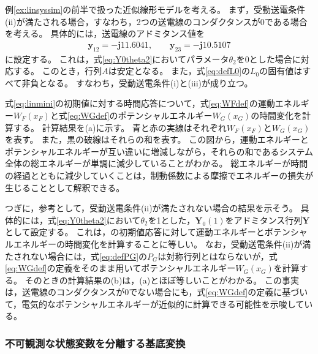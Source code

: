 \documentclass[tombow,dvipdfmx]{corona-a5-1.1}
\begin{document}
\begin{例}[蓄積されるエネルギーの時間変化]\label{ex:energylin}
例\ref{ex:linsyssim}の前半で扱った近似線形モデルを考える。
まず，受動送電条件(ii)が満たされる場合，すなわち，2つの送電線のコンダクタンスが0である場合を考える。
具体的には，送電線のアドミタンス値を
\begin{align}\label{eq:bothlossless}
\bm{y}_{12} = - \bm{j} 11.6041, \qquad
\bm{y}_{23} =  - \bm{j} 10.5107
\end{align}
に設定する。
これは，式\ref{eq:Y0theta2}においてパラメータ$\theta_2$を0とした場合に対応する。
このとき，行列$A$は安定となる。
また，式\ref{eq:defL0}の$L_0$の固有値はすべて非負となる。
すなわち，受動送電条件(i)と(iii)が成り立つ。

式\ref{eq:linmini}の初期値に対する時間応答について，式\ref{eq:WFdef}の運動エネルギー$W_F(x_F)$と式\ref{eq:WGdef}のポテンシャルエネルギー$W_G(x_G)$の時間変化を計算する。
計算結果を(a)に示す。
青と赤の実線はそれぞれ$W_F(x_F)$と$W_G(x_G)$を表す。
また，黒の破線はそれらの和を表す。
この図から，運動エネルギーとポテンシャルエネルギーが互い違いに増減しながら，それらの和であるシステム全体の総エネルギーが単調に減少していることがわかる。
総エネルギーが時間の経過とともに減少していくことは，制動係数による摩擦でエネルギーの損失が生じることとして解釈できる。

つぎに，参考として，受動送電条件(ii)が満たされない場合の結果を示そう。
具体的には，式\ref{eq:Y0theta2}において$\theta_2$を1とした，$\bm{Y}_0(1)$をアドミタンス行列$\bm{Y}$として設定する。
これは，の初期値応答に対して運動エネルギーとポテンシャルエネルギーの時間変化を計算することに等しい。
なお，受動送電条件(ii)が満たされない場合には，式\ref{eq:defPG}の$P_G$は対称行列とはならないが，式\ref{eq:WGdef}の定義をそのまま用いてポテンシャルエネルギー$W_G(x_G)$を計算する。
そのときの計算結果の(b)は，(a)とほぼ等しいことがわかる。
この事実は，送電線のコンダクタンスが0でない場合にも，式\ref{eq:WGdef}の定義に基づいて，電気的なポテンシャルエネルギーが近似的に計算できる可能性を示唆している。
\end{例}

\smallskip
\subsubsection{不可観測な状態変数を分離する基底変換}
\end{document}
